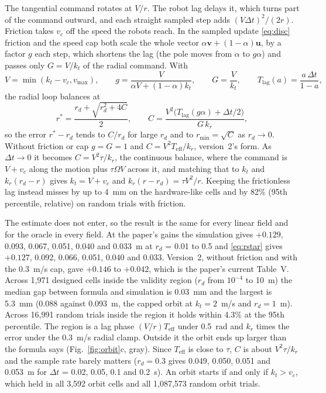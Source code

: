 \documentclass[10pt,letterpaper]{article}
\newcommand{\Teff}{T_{\mathrm{eff}}}
\newcommand{\Tlag}{T_{\mathrm{lag}}}
\newcommand{\vmax}{v_{\max}}
\newcommand{\dt}{\Delta t}
\newcommand{\vv}{\mathbf{v}}
\newcommand{\uu}{\mathbf{u}}
\begin{document}
The tangential command rotates at $V/r$. The robot lag delays it, which turns part of the command outward, and each straight sampled step adds $(V\dt)^2/(2r)$. Friction takes $v_c$ off the speed the robots reach. In the sampled update \eqref{eq:disc} friction and the speed cap both scale the whole vector $\alpha\vv + (1-\alpha)\uu$, by a factor $g$ each step, which shortens the lag (the pole moves from $\alpha$ to $g\alpha$) and passes only $G = V/k_t$ of the radial command. With
\begin{equation}\label{eq:scale}
V = \min(k_t - v_c, \vmax), \qquad g = \frac{V}{\alpha V + (1-\alpha)k_t}, \qquad G = \frac{V}{k_t}, \qquad \Tlag(a) = \frac{a\,\dt}{1-a},
\end{equation}
the radial loop balances at
\begin{equation}\label{eq:rstar}
r^* = \frac{r_d + \sqrt{r_d^2 + 4C}}{2}, \qquad C = \frac{V^2\bigl(\Tlag(g\alpha) + \dt/2\bigr)}{G\,k_r},
\end{equation}
so the error $r^* - r_d$ tends to $C/r_d$ for large $r_d$ and to $r_{\min} = \sqrt{C}$ as $r_d \to 0$. Without friction or cap $g = G = 1$ and $C = V^2\Teff/k_r$, version~2's form. As $\dt \to 0$ it becomes $C = V^2\tau/k_r$, the continuous balance, where the command is $V + v_c$ along the motion plus $\tau\Omega V$ across it, and matching that to $k_t$ and $k_r(r_d - r)$ gives $k_t = V + v_c$ and $k_r(r - r_d) = \tau V^2/r$. Keeping the frictionless lag instead misses by up to 4~mm on the hardware-like cells and by 82\% (95th percentile, relative) on random trials with friction.

The estimate does not enter, so the result is the same for every linear field and for the oracle in every field. At the paper's gains the simulation gives $+0.129$, 0.093, 0.067, 0.051, 0.040 and 0.033~m at $r_d$ = 0.01 to 0.5 and \eqref{eq:rstar} gives $+0.127$, 0.092, 0.066, 0.051, 0.040 and 0.033. Version~2, without friction and with the 0.3~m/s cap, gave $+0.146$ to $+0.042$, which is the paper's current Table~V. Across 1,971 designed cells inside the validity region ($r_d$ from $10^{-4}$ to 10~m) the median gap between formula and simulation is 0.03~mm and the largest is 5.3~mm (0.088 against 0.093~m, the capped orbit at $k_t = 2$~m/s and $r_d = 1$~m). Across 16,991 random trials inside the region it holds within 4.3\% at the 95th percentile. The region is a lag phase $(V/r)\Teff$ under 0.5~rad and $k_r$ times the error under the 0.3~m/s radial clamp. Outside it the orbit ends up larger than the formula says (Fig.~\ref{fig:orbit}c, gray). Since $\Teff$ is close to $\tau$, $C$ is about $V^2\tau/k_r$ and the sample rate barely matters ($r_d = 0.3$ gives 0.049, 0.050, 0.051 and 0.053~m for $\dt$ = 0.02, 0.05, 0.1 and 0.2~s). An orbit starts if and only if $k_t > v_c$, which held in all 3,592 orbit cells and all 1,087,573 random orbit trials.
\end{document}
